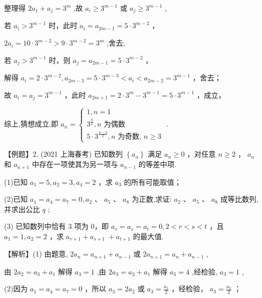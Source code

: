 \documentclass[10pt]{article}
\newcommand*\circled[1]{\tikz[baseline=(char.base)]{\node[shape=circle,draw,inner sep=1.5pt] (char) {\small #1};}}
\begin{document}
整理得 \(2{a}_{1} + {a}_{j} = {3}^{m}\) ,故 \({a}_{i} \geq  {3}^{m - 1}\) 或 \({a}_{j} \geq  {3}^{m - 1}\) ,

 \circled{1}  若 \({a}_{i} > {3}^{m - 1}\) 时，此时 \({a}_{i} = {a}_{{2m} - 1} = 5 \cdot  {3}^{m - 2}\) ，

\(2{a}_{i} = {10} \cdot  {3}^{m - 2} > 9 \cdot  {3}^{m - 2} = {3}^{m}\) ,舍去;

 \circled{2}  若 \({a}_{j} > {3}^{m - 1}\) 时，则 \({a}_{j} = {a}_{{2m} - 1} = 5 \cdot  {3}^{m - 2}\) ，

解得 \({a}_{i} = 2 \cdot  {3}^{m - 2},{a}_{{2m} - 3} = 5 \cdot  {3}^{m - 3} < {a}_{i} < {a}_{{2m} - 2} = {3}^{m - 1}\) ，舍去；

故 \({a}_{i} = {a}_{j} = {3}^{m - 1}\) ，此时 \({a}_{{2m} + 1} = 2 \cdot  {3}^{m} - {3}^{m - 1} = 5 \cdot  {3}^{m - 1}\) ，成立，

综上,猜想成立,即 \({a}_{n} = \left\{  \begin{array}{l} 1,n = 1 \\  {3}^{\frac{n}{2}},n\text{ 为偶数 } \\  5 \cdot  {3}^{\frac{n - 3}{2}},n\text{ 为奇数, }n \geq  3 \end{array}\right.\) .

【例题】2. (2021 上海春考) 已知数列 \(\left\{  {a}_{n}\right\}\) 满足 \({a}_{n} \geq  0\) ，对任意 \(n \geq  2\) ， \({a}_{n}\) 和 \({a}_{n + 1}\) 中存在一项使其为另一项与 \({a}_{n - 1}\) 的等差中项.

(1)已知 \({a}_{1} = 5,{a}_{2} = 3,{a}_{4} = 2\) ，求 \({a}_{3}\) 的所有可能取值；

(2)已知 \({a}_{1} = {a}_{4} = {a}_{7} = 0,{a}_{2}\text{ 、 }{a}_{5}\text{ 、 }{a}_{8}\) 为正数,求证: \({a}_{2}\text{ 、 }{a}_{5}\text{ 、 }{a}_{8}\) 成等比数列,并求出公比 \(q\) ;

(3) 已知数列中恰有 3 项为 0，即 \({a}_{r} = {a}_{s} = {a}_{t} = 0,2 < r < s < t\) ，且 \({a}_{1} = 1,{a}_{2} = 2\) ，求 \({a}_{r + 1} + {a}_{s + 1} \; + {a}_{t + 1}\) 的最大值.

【解析】(1) 由题意, \(2{a}_{n} = {a}_{n + 1} + {a}_{n - 1}\) 或 \(2{a}_{n + 1} = {a}_{n} + {a}_{n - 1}\) ,

由 \(2{a}_{2} = {a}_{3} + {a}_{1}\) 解得 \({a}_{3} = 1\) ,由 \(2{a}_{3} = {a}_{2} + {a}_{1}\) 解得 \({a}_{3} = 4\) ,经检验, \({a}_{3} = 1\) ,

(2)因为 \({a}_{1} = {a}_{4} = {a}_{7} = 0\) ，所以 \({a}_{3} = 2{a}_{2}\) 或 \({a}_{3} = \frac{{a}_{2}}{2}\) ，经检验， \({a}_{3} = \frac{{a}_{2}}{2}\) ；
\end{document}
